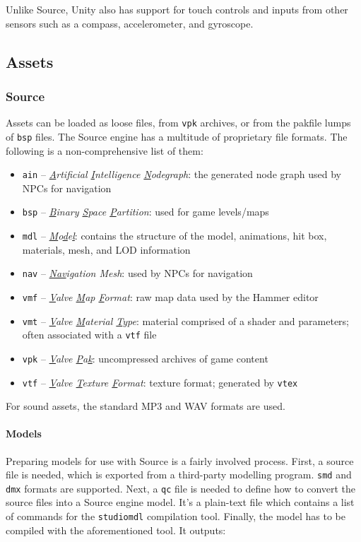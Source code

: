 \documentclass[a4paper, 12pt]{scrartcl}
\begin{document}
Unlike Source, Unity also has support for touch controls and inputs from other sensors such as a compass, accelerometer, and gyroscope.

\subsection{Assets}
\subsubsection{Source}
Assets can be loaded as loose files, from \texttt{vpk} archives, or from the pakfile lumps of \texttt{bsp} files. The Source engine has a multitude of proprietary file formats. The following is a non-comprehensive list of them:

\begin{itemize}
  \item \texttt{ain} -- \textit{\underline{A}rtificial \underline{I}ntelligence \underline{N}odegraph}: the generated node graph used by NPCs for navigation
  \item \texttt{bsp} -- \textit{\underline{B}inary \underline{S}pace \underline{P}artition}: used for game levels/maps
  \item \texttt{mdl} -- \textit{\underline{M}o\underline{d}e\underline{l}}: contains the structure of the model, animations, hit box, materials, mesh, and LOD information
  \item \texttt{nav} -- \textit{\underline{Nav}igation Mesh}: used by NPCs for navigation
  \item \texttt{vmf} -- \textit{\underline{V}alve \underline{M}ap \underline{F}ormat}: raw map data used by the Hammer editor
  \item \texttt{vmt} -- \textit{\underline{V}alve \underline{M}aterial \underline{T}ype}: material comprised of a shader and parameters; often associated with a \texttt{vtf} file
  \item \texttt{vpk} -- \textit{\underline{V}alve \underline{P}a\underline{k}}: uncompressed archives of game content
  \item \texttt{vtf} -- \textit{\underline{V}alve \underline{T}exture \underline{F}ormat}: texture format; generated by \texttt{vtex}
\end{itemize}

For sound assets, the standard MP3 and WAV formats are used.

\paragraph{Models}
Preparing models for use with Source is a fairly involved process. First, a source file is needed, which is exported from a third-party modelling program. \texttt{smd} and \texttt{dmx} formats are supported. Next, a \texttt{qc} file is needed to define how to convert the source files into a Source engine model. It's a plain-text file which contains a list of commands for the \texttt{studiomdl} compilation tool. Finally, the model has to be compiled with the aforementioned tool. It outputs:
\end{document}
